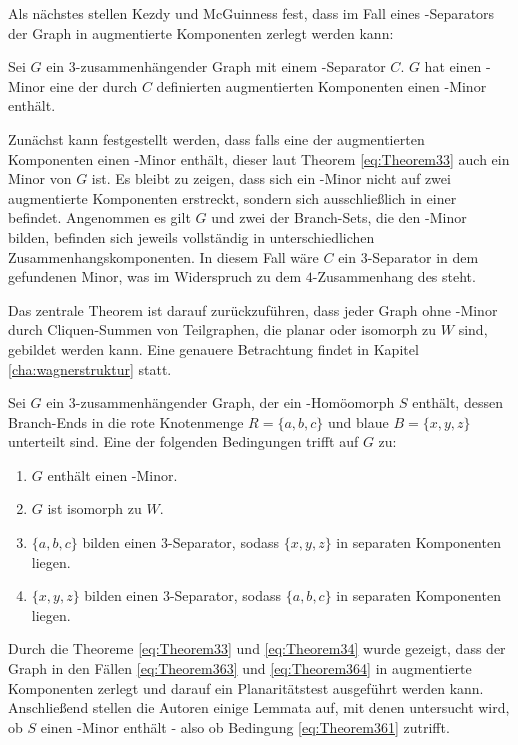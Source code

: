 Als nächstes stellen Kezdy und McGuinness fest, dass im Fall eines \dd-Separators der Graph in augmentierte Komponenten zerlegt werden kann:
\begin{theorem}\label{eq:Theorem34}
  Sei $G$ ein $3$-zusammenhängender Graph mit einem \dd-Separator $C$.
  $G$ hat einen \kf-Minor \gdw eine der durch $C$ definierten augmentierten Komponenten einen \kf-Minor enthält.
\end{theorem}
\begin{beweis}
  Zunächst kann festgestellt werden, dass falls eine der augmentierten Komponenten einen \kf-Minor enthält, dieser laut Theorem \ref{eq:Theorem33} auch ein Minor von $G$ ist.
  Es bleibt zu zeigen, dass sich ein \kf-Minor nicht auf zwei augmentierte Komponenten erstreckt, sondern sich ausschließlich in einer befindet.
  Angenommen es gilt \kf \minor $G$ und zwei der Branch-Sets, die den \kf-Minor bilden, befinden sich jeweils vollständig in unterschiedlichen Zusammenhangskomponenten.
  In diesem Fall wäre $C$ ein $3$-Separator in dem gefundenen Minor, was im Widerspruch zu dem $4$-Zusammenhang des \kf steht.
\end{beweis}

Das zentrale Theorem ist darauf zurückzuführen, dass jeder Graph ohne \kf-Minor durch Cliquen-Summen von Teilgraphen, die planar oder isomorph zu $W$ sind, gebildet werden kann.\cite{Wag37}
Eine genauere Betrachtung findet in Kapitel \ref{cha:wagnerstruktur} statt.
\begin{theorem}\label{eq:Theorem36}
  Sei $G$ ein $3$-zusammenhängender Graph, der ein \kdd-Homöomorph $S$ enthält, dessen Branch-Ends in die rote Knotenmenge $R = \{a, b, c\}$ und blaue $B = \{x, y, z\}$ unterteilt sind.
  Eine der folgenden Bedingungen trifft auf $G$ zu:
  \begin{enumerate}
    \item $G$ enthält einen \kf-Minor.\label{eq:Theorem361}
    \item $G$ ist isomorph zu $W$.\label{eq:Theorem362}
    \item $\{a, b, c\}$ bilden einen $3$-Separator, sodass $\{x, y, z\}$ in separaten Komponenten liegen.\label{eq:Theorem363}
    \item $\{x, y, z\}$ bilden einen $3$-Separator, sodass $\{a, b, c\}$ in separaten Komponenten liegen.\label{eq:Theorem364}
  \end{enumerate}
\end{theorem}
Durch die Theoreme \ref{eq:Theorem33} und \ref{eq:Theorem34} wurde gezeigt, dass der Graph in den Fällen \ref{eq:Theorem363} und \ref{eq:Theorem364} in augmentierte Komponenten zerlegt und darauf ein Planaritätstest ausgeführt werden kann.
Anschließend stellen die Autoren einige Lemmata auf, mit denen untersucht wird, ob $S$ einen \kf-Minor enthält - also ob Bedingung \ref{eq:Theorem361} zutrifft.

